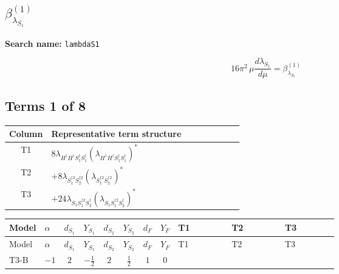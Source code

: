 \documentclass[8pt]{article}
\begin{document}
\begin{landscape}
\section*{$\beta_{\lambda_{S_1}}^{(1)}$}
\noindent\textbf{Search name: }\texttt{lambdaS1}\par\smallskip
\[16\pi^2\,\mu\frac{d \lambda_{S_1}}{d\mu}=\beta_{\lambda_{S_1}}^{(1)}\]
\subsection*{Terms 1 of 8}
\begin{center}
\begin{tabular}{@{}c >{\raggedright\arraybackslash}p{0.82\linewidth}@{}}
\toprule
Column & Representative term structure \\
\midrule
T1 & \(\displaystyle 8 {\lambda_{H^\dagger H^\dagger S_1^\dagger S_1^\dagger}} \left({\lambda_{H^\dagger H^\dagger S_1^\dagger S_1^\dagger}}\right)^{*}\) \\
\midrule
T2 & \(\displaystyle +8 {\lambda_{S_1^{\dagger 2}S_2^{\dagger 2}}} \left({\lambda_{S_1^{\dagger 2}S_2^{\dagger 2}}}\right)^{*}\) \\
\midrule
T3 & \(\displaystyle +24 {\lambda_{S_1 S_1^{\dagger 2}S_2^\dagger}} \left({\lambda_{S_1 S_1^{\dagger 2}S_2^\dagger}}\right)^{*}\) \\
\midrule
\bottomrule
\end{tabular}
\end{center}
\smallskip
\tiny
\begin{longtable}{@{}llcccccc >{\raggedright\arraybackslash}p{0.21\linewidth} >{\raggedright\arraybackslash}p{0.21\linewidth} >{\raggedright\arraybackslash}p{0.21\linewidth}@{}}
\toprule
Model & $\alpha$ & $d_{S_1}$ & $Y_{S_1}$ & $d_{S_2}$ & $Y_{S_2}$ & $d_F$ & $Y_F$ & T1 & T2 & T3 \\
\midrule
\endfirsthead
\toprule
Model & $\alpha$ & $d_{S_1}$ & $Y_{S_1}$ & $d_{S_2}$ & $Y_{S_2}$ & $d_F$ & $Y_F$ & T1 & T2 & T3 \\
\midrule
\endhead
T3-B & $-1$ & $2$ & $-\frac{1}{2}$ & $2$ & $\frac{1}{2}$ & $1$ & $0$ & \scriptsize\adjustbox{max width=\linewidth}{$\begin{gathered} 8 {\lambda_{H^\dagger H^\dagger S_1^\dagger S_1^\dagger}} \left({\lambda_{H^\dagger H^\dagger S_1^\dagger S_1^\dagger}}\right)^{*}\end{gathered}$} & \scriptsize\adjustbox{max width=\linewidth}{$\begin{gathered} +8 {\lambda_{S_1^{\dagger 2}S_2^{\dagger 2}}} \left({\lambda_{S_1^{\dagger 2}S_2^{\dagger 2}}}\right)^{*}\end{gathered}$} & \scriptsize\adjustbox{max width=\linewidth}{$\begin{gathered} +24 {\lambda_{S_1 S_1^{\dagger 2}S_2^\dagger}} \left({\lambda_{S_1 S_1^{\dagger 2}S_2^\dagger}}\right)^{*}\end{gathered}$} \\

\end{longtable}
\end{landscape}
\end{document}
